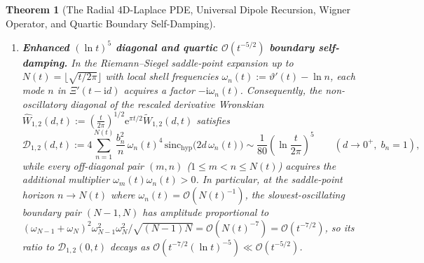 \documentclass[11pt,reqno]{amsart}
\newtheorem{theorem}{Theorem}[section]
\theoremstyle{definition}
\theoremstyle{remark}
\numberwithin{equation}{section}
\newcommand{\ee}{\mathrm{e}}
\newcommand{\ii}{\mathrm{i}}
\newcommand{\sinch}{\mathrm{sinc}_{\mathrm{hyp}}}
\begin{document}
\begin{theorem}[The Radial 4D-Laplace PDE, Universal Dipole Recursion, Wigner Operator, and Quartic Boundary Self-Damping]
\begin{enumerate}[label=\textup{(\roman*)},leftmargin=2.2em]
\begin{equation}
\end{equation}
\item \textbf{Enhanced $(\ln t)^5$ diagonal and quartic $\mathcal{O}(t^{-5/2})$ boundary self-damping.} In the Riemann--Siegel saddle-point expansion up to $N(t) = \lfloor\sqrt{t/2\pi}\rfloor$ with local shell frequencies $\omega_n(t) := \vartheta'(t) - \ln n$, each mode $n$ in $\Xi'(t-\ii d)$ acquires a factor $-\ii\omega_n(t)$. Consequently, the non-oscillatory diagonal of the rescaled derivative Wronskian $\widehat{W}_{1,2}(d,t) := (\frac{t}{2\pi})^{1/2}\ee^{\pi t/2}\widetilde{W}_{1,2}(d,t)$ satisfies
\begin{equation}\label{eq:W12_diagonal_lnt5}
\mathcal{D}_{1,2}(d,t) := 4\sum_{n=1}^{N(t)} \frac{b_n^2}{n}\,\omega_n(t)^4\,\sinch\bigl(2d\,\omega_n(t)\bigr) \sim \frac{1}{80}\left(\ln\frac{t}{2\pi}\right)^5 \qquad (d \to 0^+,\; b_n = 1),
\end{equation}
while every off-diagonal pair $(m,n)$ ($1 \le m < n \le N(t)$) acquires the additional multiplier $\omega_m(t)\omega_n(t) > 0$. In particular, at the saddle-point horizon $n \to N(t)$ where $\omega_n(t) = \mathcal{O}(N(t)^{-1})$, the slowest-oscillating boundary pair $(N-1, N)$ has amplitude proportional to $(\omega_{N-1}+\omega_N)^2\omega_{N-1}^2\omega_N^2 / \sqrt{(N-1)N} = \mathcal{O}(N(t)^{-7}) = \mathcal{O}(t^{-7/2})$, so its ratio to $\mathcal{D}_{1,2}(0,t)$ decays as $\mathcal{O}(t^{-7/2}(\ln t)^{-5}) \ll \mathcal{O}(t^{-5/2})$.
\end{enumerate}
\end{theorem}
\end{document}
